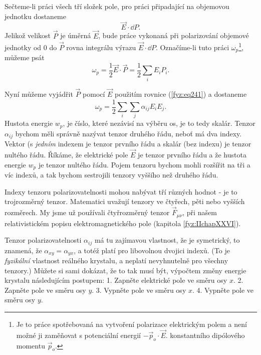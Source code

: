 
    Sečteme-li práci všech tří složek pole, pro práci připadající na objemovou jednotku dostaneme
    \begin{equation*}
      \vec{E}\cdot\dd{P}.
    \end{equation*}
    Jelikož velikost \(\vec{P}\) je úměrná \(\vec{E}\), bude práce vykonaná při polarizování
    objemové jednotky od 0 do \(\vec{P}\) rovna integrálu výrazu \(\vec{E}\cdot\dd{P}\). Označíme-li
    tuto práci \(\omega_p\)\footnote{Je to práce spotřebovaná na vytvoření polarizace elektrickým
    polem a není možné ji zaměňovat s potenciální energií \(-\vec{p}_o\cdot\vec{E}\). konstantního
    dipólového momentu \(\vec{p}_o\).}, můžeme psát
    \begin{equation}\label{fyz:eq242}
      \omega_p = \frac{1}{2}\vec{E}\cdot\vec{P} = \frac{1}{2}\sum_iE_iP_i.
    \end{equation}

    Nyní můžeme vyjádřit \(\vec{P}\) pomocí \(\vec{E}\) použitím rovnice (\ref{fyz:eq241}) a
    dostaneme
    \begin{equation}\label{fyz:eq243}
      \omega_p = \frac{1}{2}\sum_i\sum_j\alpha_{ij}E_iE_j.
    \end{equation}
    Hustota energie \(w_p\), je číslo, které nezávisí na výběru os, je to tedy skalár. Tenzor
    \(\alpha_{ij}\) bychom měli správně nazývat tenzor druhého řádu, neboť má dva indexy. Vektor (s
    \emph{jedním} indexem je tenzor prvního řádu a skalár (bez indexu) je tenzor nultého řádu.
    Říkáme, že elektrické pole \(\vec{E}\) je tenzor prvního řádu a že hustota energie \(w_p\) je
    tenzor nultého řádu. Pojem tenzoru bychom mohli rozšířit na tři a víc indexů, a tak bychom
    sestrojili tenzory vyššího než druhého řádu.

    Indexy tenzoru polarizovatelnosti mohou nabývat tří různých hodnot - je to trojrozměrný tenzor.
    Matematici uvažují tenzory ve čtyřech, pěti nebo vyšších rozměrech. My jsme už používali
    čtyřrozměrný tenzor \(\vec{F}_{\mu\nu}\), při našem relativistickém popisu elektromagnetického
    pole (kapitola \ref{fyz:IIchapXXVI}).

    Tenzor polarizovatelnosti \(\alpha_{ij}\) má tu zajímavou vlastnost, že je symetrický, to
    znamená, že \(\alpha_{xy} = \alpha_{yx}\), a totéž platí pro libovolnou dvojici indexů. (To je
    \emph{fyzikální} vlastnost reálného krystalu, a neplatí nevyhnutelně pro všechny tenzory.)
    Můžete si sami dokázat, že to tak musí být, výpočtem změny energie krystalu následujícím
    postupem: 1. Zapněte elektrické pole ve směru osy \(x\). 2. Zapněte pole ve směru osy \(y\). 3.
    Vypněte pole ve směru osy \(x\). 4. Vypněte pole ve směru osy \(y\).

